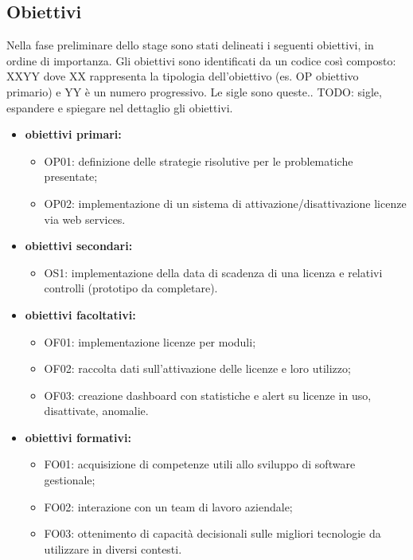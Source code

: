 \subsection{Obiettivi}
Nella fase preliminare dello stage sono stati delineati i seguenti obiettivi, in ordine di importanza. Gli obiettivi sono identificati da un codice così composto: XXYY dove XX rappresenta la tipologia dell'obiettivo (es. OP obiettivo primario) e YY è un numero progressivo.
Le sigle sono queste.. TODO: sigle, espandere e spiegare nel dettaglio gli obiettivi.
\begin{itemize}

\item \textbf{obiettivi primari:}\begin{itemize}
\item OP01: definizione delle strategie risolutive per le problematiche presentate;
\item OP02: implementazione di un sistema di attivazione/disattivazione licenze via web services.
\end{itemize}
\item \textbf{obiettivi secondari:}\begin{itemize}
\item OS1: implementazione della data di scadenza di una licenza e relativi controlli (prototipo da completare).
\end{itemize}
\item \textbf{obiettivi facoltativi:}\begin{itemize}
\item OF01: implementazione licenze per moduli;
\item OF02: raccolta dati sull’attivazione delle licenze e loro utilizzo;
\item OF03: creazione dashboard con statistiche e alert su licenze in uso, disattivate, anomalie.
\end{itemize}
\item \textbf{obiettivi formativi:}\begin{itemize}
\item FO01: acquisizione di competenze utili allo sviluppo di software gestionale;
\item FO02: interazione con un team di lavoro aziendale;
\item FO03: ottenimento di capacità decisionali sulle migliori tecnologie da utilizzare in diversi contesti.
\end{itemize}

\end{itemize}

